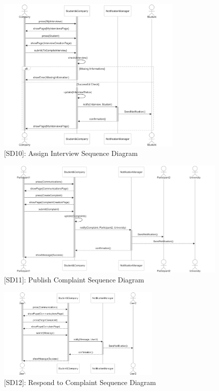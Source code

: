\begin{figure}
    \centering
    \includegraphics[width=0.8\textwidth]{Latex/Images/AssignInterviewSequenceDiagram.png}
    \caption{[SD10]: Assign Interview Sequence Diagram}
    \label{fig:SD10}
\end{figure}
\clearpage

\begin{figure}
    \centering
    \includegraphics[width=1\textwidth]{Latex/Images/PublishComplaintSequenceDiagram.png}
    \caption{[SD11]: Publish Complaint Sequence Diagram}
    \label{fig:SD11}
\end{figure}

\begin{figure}
    \centering
    \includegraphics[width=0.7\textwidth]{Latex/Images/RespondToComplaintSequenceDiagram.png}
    \caption{[SD12]: Respond to Complaint Sequence Diagram}
    \label{fig:SD12}
\end{figure}

